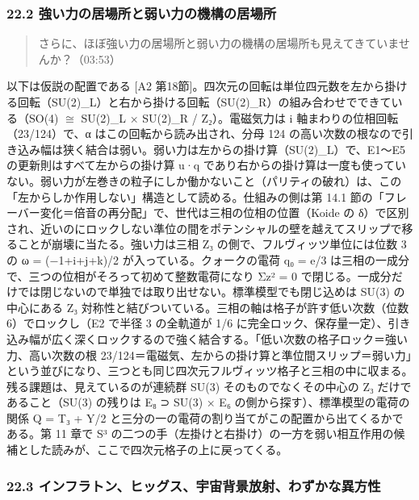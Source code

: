 \documentclass[
  a4paper,
]{ltjsarticle}
\begin{document}
\subsubsection{22.2
強い力の居場所と弱い力の機構の居場所}\label{ux5f37ux3044ux529bux306eux5c45ux5834ux6240ux3068ux5f31ux3044ux529bux306eux6a5fux69cbux306eux5c45ux5834ux6240}

\begin{quote}
さらに、ほぼ強い力の居場所と弱い力の機構の居場所も見えてきていませんか？（03:53）
\end{quote}

以下は仮説の配置である {[}A2
第18節{]}。四次元の回転は単位四元数を左から掛ける回転（SU(2)\_L）と右から掛ける回転（SU(2)\_R）の組み合わせでできている（SO(4)
\(\cong\) SU(2)\_L × SU(2)\_R / Z₂）。電磁気力は i
軸まわりの位相回転（23/124）で、α はこの回転から読み出され、分母 124
の高い次数の根なので引き込み幅は狭く結合は弱い。弱い力は左からの掛け算（SU(2)\_L）で、E1〜E5
の更新則はすべて左からの掛け算 u·q
であり右からの掛け算は一度も使っていない。弱い力が左巻きの粒子にしか働かないこと（パリティの破れ）は、この「左からしか作用しない」構造として読める。仕組みの側は第
14.1
節の「フレーバー変化＝倍音の再分配」で、世代は三相の位相の位置（Koide の
δ）で区別され、近いのにロックしない準位の間をポテンシャルの壁を越えてスリップで移ることが崩壊に当たる。強い力は三相
Z₃ の側で、フルヴィッツ単位には位数 3 の ω = (−1+i+j+k)/2
が入っている。クォークの電荷 q₀ = e/3
は三相の一成分で、三つの位相がそろって初めて整数電荷になり Σz² = 0
で閉じる。一成分だけでは閉じないので単独では取り出せない。標準模型でも閉じ込めは
SU(3) の中心にある Z₃
対称性と結びついている。三相の軸は格子が許す低い次数（位数
6）でロックし（E2 で半径 3 の全軌道が 1/6
に完全ロック、保存量一定）、引き込み幅が広く深くロックするので強く結合する。「低い次数の格子ロック＝強い力、高い次数の根
23/124＝電磁気、左からの掛け算と準位間スリップ＝弱い力」という並びになり、三つとも同じ四次元フルヴィッツ格子と三相の中に収まる。残る課題は、見えているのが連続群
SU(3) そのものでなくその中心の Z₃ だけであること（SU(3) の残りは E₈ ⊃
SU(3) × E₆ の側から探す）、標準模型の電荷の関係 Q = T₃ + Y/2
と三分の一の電荷の割り当てがこの配置から出てくるかである。第 11 章で S³
の二つの手（左掛けと右掛け）の一方を弱い相互作用の候補とした読みが、ここで四次元格子の上に戻ってくる。

\subsubsection{22.3
インフラトン、ヒッグス、宇宙背景放射、わずかな異方性}\label{ux30a4ux30f3ux30d5ux30e9ux30c8ux30f3ux30d2ux30c3ux30b0ux30b9ux5b87ux5b99ux80ccux666fux653eux5c04ux308fux305aux304bux306aux7570ux65b9ux6027}
\end{document}

